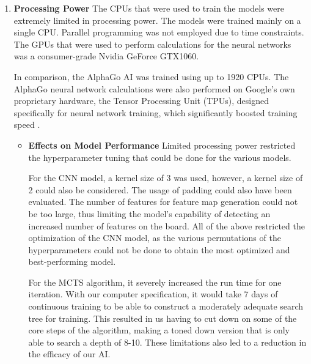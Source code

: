 \documentclass[a4paper,12pt,table]{article}
\begin{document}
\begin{enumerate}
    \item \textbf{Processing Power}
    \newline
    The CPUs that were used to train the models were extremely limited in processing power. The models were trained mainly on a single CPU. Parallel programming was not employed due to time constraints. The GPUs that were used to perform calculations for the neural networks was a consumer-grade Nvidia GeForce GTX1060. \par

    In comparison, the AlphaGo AI was trained using up to 1920 CPUs. The AlphaGo neural network calculations were also performed on Google’s own proprietary hardware, the Tensor Processing Unit (TPUs), designed specifically for neural network training, which significantly boosted training speed \cite{Mastering the game of Go with deep neural networks and tree search}. \par

    \begin{itemize}
        \item \textbf{Effects on Model Performance}
        \newline
        Limited processing power restricted the hyperparameter tuning that could be done for the various models. \par

        For the CNN model, a kernel size of 3 was used, however, a kernel size of 2 could also be considered. The usage of padding could also have been evaluated. The number of features for feature map generation could not be too large, thus limiting the model’s capability of detecting an increased number of features on the board. All of the above restricted the optimization of the CNN model, as the various permutations of the hyperparameters could not be done to obtain the most optimized and best-performing model. \par

        For the MCTS algorithm, it severely increased the run time for one iteration. With our computer specification, it would take 7 days of continuous training to be able to construct a moderately adequate search tree for training. This resulted in us having to cut down on some of the core steps of the algorithm, making a toned down version that is only able to search a depth of 8-10. These limitations also led to a reduction in the efficacy of our AI. \par


\end{itemize}
\end{enumerate}
\end{document}
